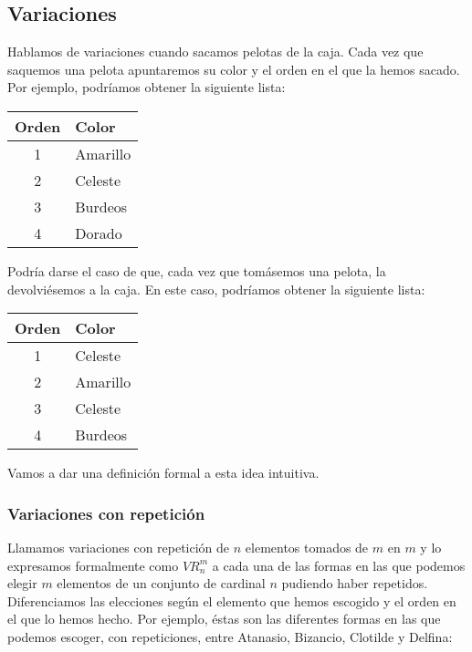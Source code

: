 \subsection{Variaciones}\label{variaciones}

Hablamos de variaciones cuando sacamos pelotas de la caja.
Cada vez que saquemos una pelota apuntaremos su color y el orden en el que la hemos sacado.
Por ejemplo, podríamos obtener la siguiente lista:

\begin{center}
\begin{tabular}{c l}
	\textbf{Orden} & \textbf{Color} \\
	\toprule
	1              & Amarillo       \\
	2              & Celeste        \\
	3              & Burdeos        \\
	4              & Dorado
\end{tabular}
\end{center}

Podría darse el caso de que, cada vez que tomásemos una pelota, la devolviésemos a la caja.
En este caso, podríamos obtener la siguiente lista:

\begin{center}
\begin{tabular}{c l}
	\textbf{Orden} & \textbf{Color} \\
	\toprule
	1              & Celeste        \\
	2              & Amarillo       \\
	3              & Celeste        \\
	4              & Burdeos
\end{tabular}
\end{center}

Vamos a dar una definición formal a esta idea intuitiva.

\subsubsection{Variaciones con repetición}

Llamamos variaciones con repetición de $n$ elementos tomados de $m$ en $m$ y lo expresamos formalmente como $VR_{n}^{m}$ a cada una de las formas en las que podemos elegir $m$ elementos de un conjunto de cardinal $n$ pudiendo haber repetidos.
Diferenciamos las elecciones según el elemento que hemos escogido y el orden en el que lo hemos hecho.
Por ejemplo, éstas son las diferentes formas en las que podemos escoger, con repeticiones, entre Atanasio, Bizancio, Clotilde y Delfina:

